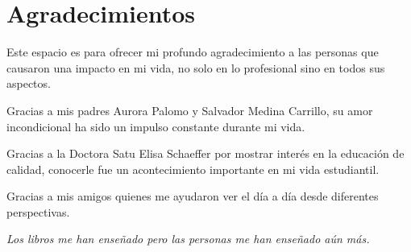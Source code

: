 
\chapter{Agradecimientos}

Este espacio es para ofrecer mi profundo agradecimiento a las personas que
causaron una impacto en mi vida,
no solo en lo profesional sino en todos sus aspectos.

Gracias a mis padres Aurora Palomo y Salvador Medina Carrillo,
su amor incondicional ha sido un impulso constante durante mi vida.

Gracias a la Doctora Satu Elisa Schaeffer por mostrar interés en la educación
de calidad, conocerle fue un acontecimiento importante en mi vida estudiantil.

Gracias a mis amigos quienes me ayudaron ver el día a día desde diferentes
perspectivas.


\textit{Los libros me han enseñado
pero las personas me han enseñado aún más.}

